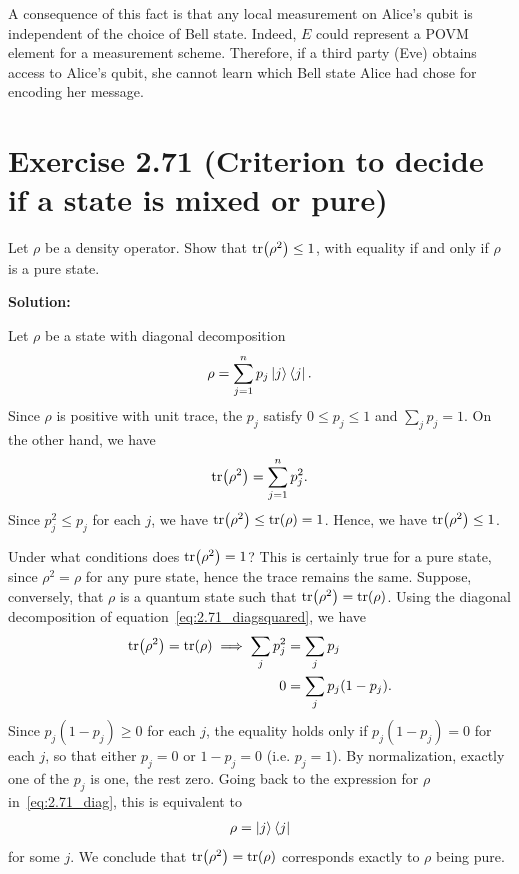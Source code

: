 \documentclass{book}
\begin{document}
    A consequence of this fact is that any local measurement on Alice's qubit is independent of the choice of Bell state. Indeed, $E$ could represent a POVM element for a measurement scheme. Therefore, if a third party (Eve) obtains access to Alice's qubit, she cannot learn which Bell state Alice had chose for encoding her message.

\section*{Exercise 2.71 (Criterion to decide if a state is mixed or pure)}
    Let $\rho$ be a density operator. Show that $\tr(\rho^2) \leq  1$, with equality if and only if $\rho$ is a pure state.

    \textbf{Solution:} 
    
    Let $\rho$ be a state with diagonal decomposition
    \begin{align} \label{eq:2.71_diag}
        \rho = \sum_{j = 1}^n p_j \ket{j}\bra{j}.
    \end{align}
    Since $\rho$ is positive with unit trace, the $p_j$ satisfy $0 \leq p_j \leq 1$ and $\sum_j p_j = 1$. On the other hand, we have
    \begin{align} \label{eq:2.71_diagsquared}
        \tr(\rho^2) = \sum_{j=1}^n p_j^2.
    \end{align}
    Since $p_j^2 \leq p_j$ for each $j$, we have $\tr(\rho^2) \leq \tr(\rho) = 1$. Hence, we have $\tr(\rho^2) \leq 1$. 
    
    Under what conditions does $\tr(\rho^2) = 1$? This is certainly true for a pure state, since $\rho^2 = \rho$ for any pure state, hence the trace remains the same. Suppose, conversely, that $\rho$ is a quantum state such that $\tr(\rho^2) = \tr(\rho)$. Using the diagonal decomposition of equation~\eqref{eq:2.71_diagsquared}, we have
    \begin{align}
    \begin{aligned}
        \tr(\rho^2) = \tr(\rho) \implies \sum_{j} p_j^2 &= \sum_j p_j \\
        0 &= \sum_j p_j(1-p_j).
    \end{aligned}
    \end{align}
    Since $p_j(1-p_j) \geq 0$ for each $j$, the equality holds only if $p_j(1-p_j) = 0$ for each $j$, so that either $p_j = 0$ or $1-p_j = 0$ (i.e. $p_j = 1$). By normalization, exactly one of the $p_j$ is one, the rest zero. Going back to the expression for $\rho$ in~\eqref{eq:2.71_diag}, this is equivalent to
    \begin{align}
        \rho = \ket{j}\bra{j}
    \end{align}
    for some $j$. We conclude that $\tr(\rho^2) = \tr(\rho)$ corresponds exactly to $\rho$ being pure.
\end{document}
